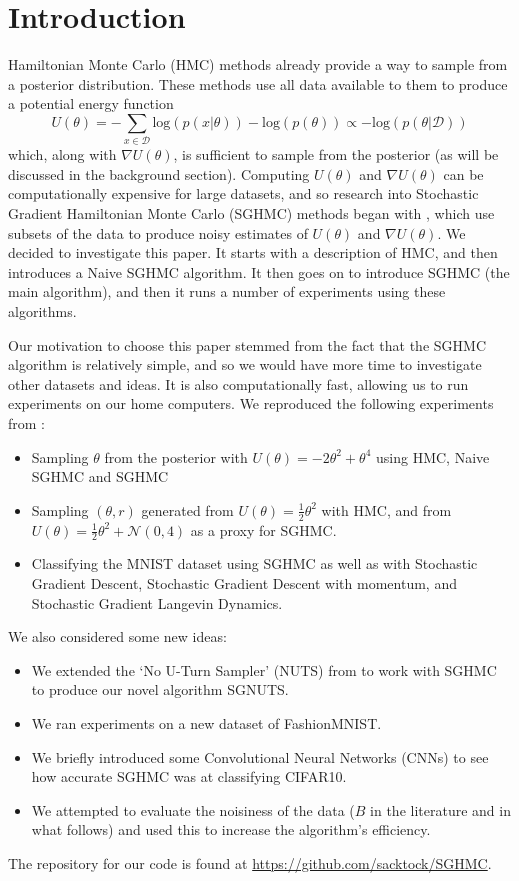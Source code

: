 
\section{Introduction}

Hamiltonian Monte Carlo (HMC) methods already provide a way to sample from a posterior distribution. These methods use all data available to them to produce a potential energy function $$U(\theta) = - \sum_{x\in\mathcal{D}}\text{log}(p(x| \theta)) - \text{log}(p(\theta )) \propto -\text{log}(p(\theta | \mathcal{D}))$$
which, along with $\nabla U(\theta)$, is sufficient to sample from the posterior (as will be discussed in the background section). Computing $U(\theta)$ and $\nabla U(\theta)$ can be computationally expensive for large datasets, and so research into Stochastic Gradient Hamiltonian Monte Carlo (SGHMC) methods began with \cite{sghmc}, which use subsets of the data to produce noisy estimates of $U(\theta)$ and $\nabla U(\theta)$. We decided to investigate this paper. It starts with a description of HMC, and then introduces a Naive SGHMC algorithm. It then goes on to introduce SGHMC (the main algorithm), and then it runs a number of experiments using these algorithms.

Our motivation to choose this paper stemmed from the fact that the SGHMC algorithm is relatively simple, and so we would have more time to investigate other datasets and ideas. It is also computationally fast, allowing us to run experiments on our home computers. We reproduced the following experiments from \cite{sghmc}:

\begin{itemize}
    \item Sampling $\theta$ from the posterior with $U(\theta) = -2\theta^2 + \theta^4$ using HMC, Naive SGHMC and SGHMC
    \item Sampling $(\theta,r)$ generated from $U(\theta) = \frac{1}{2}\theta^2$ with HMC, and from $U(\theta) = \frac{1}{2}\theta^2 + \mathcal{N}(0,4)$ as a proxy for SGHMC.
    \item Classifying the MNIST dataset using SGHMC as well as with Stochastic Gradient Descent, Stochastic Gradient Descent with momentum, and Stochastic Gradient Langevin Dynamics.
\end{itemize}

We also considered some new ideas:

\begin{itemize}
    \item We extended the `No U-Turn Sampler' (NUTS) from \cite{nuts} to work with SGHMC to produce our novel algorithm SGNUTS.
    \item We ran experiments on a new dataset of FashionMNIST.
    \item We briefly introduced some Convolutional Neural Networks (CNNs) to see how accurate SGHMC was at classifying CIFAR10.
    \item We attempted to evaluate the noisiness of the data ($B$ in the literature and in what follows) and used this to increase the algorithm's efficiency.
\end{itemize}

The repository for our code is found at \url{https://github.com/sacktock/SGHMC}.
